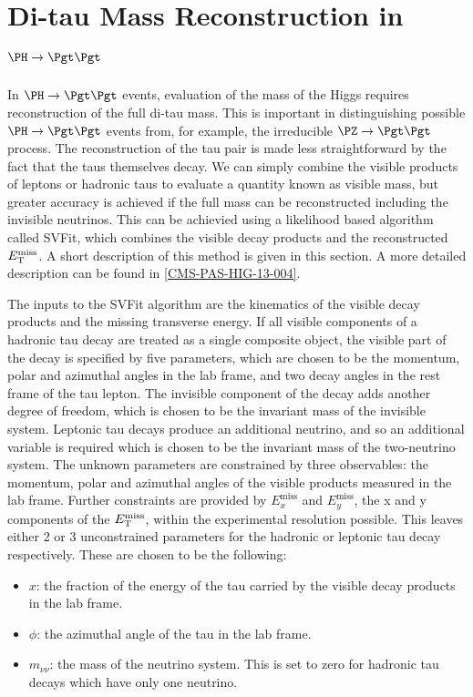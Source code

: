 \section{Di-tau Mass Reconstruction in $\PH \to \Pgt\Pgt$}
\label{sec:svfit}

In $\PH \to \Pgt\Pgt$ events, evaluation of the mass of the Higgs requires reconstruction of the 
full di-tau mass. This is important in distinguishing possible $\PH\to\Pgt\Pgt$
events from, for example, the irreducible $\PZ \to \Pgt\Pgt$ process. 
The reconstruction of the tau pair is made less straightforward
by the fact that the taus themselves decay. We can simply combine the visible
products of leptons or hadronic taus to evaluate a quantity known as visible mass,
but greater accuracy is achieved if the full mass can be reconstructed including the
invisible neutrinos. This can be achievied using a likelihood based algorithm called
SVFit, which combines the visible decay products and the reconstructed $E_{\mathrm{T}}^{\text{miss}}$. A
short description of this method is given in this section. A more detailed
description can be found in \ref{CMS-PAS-HIG-13-004}.

The inputs to the SVFit algorithm are the kinematics of the visible decay
products and the missing transverse energy. If all visible components of a
hadronic tau decay are treated as a single composite object, the visible part of
the decay is specified by five parameters, which are chosen to be the momentum,
polar and azimuthal angles in the lab frame, and two decay angles in the rest
frame of the tau lepton. The invisible component of the decay adds another
degree of freedom, which is chosen to be the invariant mass of the invisible
system. Leptonic tau decays produce an additional neutrino, and so an additional
variable is required which is chosen to be the invariant mass of the
two-neutrino system. The unknown parameters are constrained by three
observables: the momentum, polar and azimuthal angles of the visible products
measured in the lab frame. Further constraints are provided by
$E_{x}^{\text{miss}}$ and $E_{y}^{\text{miss}}$, the x and y components of the
$E_{\mathrm{T}}^{\text{miss}}$, within the experimental resolution possible. This leaves either 2 or 3 
unconstrained parameters for the hadronic or leptonic tau decay respectively. 
These are chosen to be the following:

\begin{itemize}
\item $x$: the fraction of the energy of the tau carried by the visible decay
products in the lab frame.
\item $\phi$: the azimuthal angle of the tau in the lab frame. 
\item $m_{\nu\nu}$: the mass of the neutrino system. This is set to zero for hadronic tau
decays which have only one neutrino.
\end{itemize}

